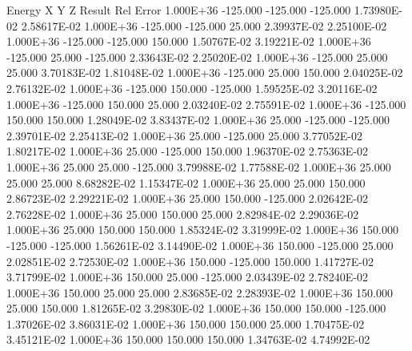    Energy         X         Y         Z     Result     Rel Error
  1.000E+36  -125.000  -125.000  -125.000 1.73980E-02 2.58617E-02
  1.000E+36  -125.000  -125.000    25.000 2.39937E-02 2.25100E-02
  1.000E+36  -125.000  -125.000   150.000 1.50767E-02 3.19221E-02
  1.000E+36  -125.000    25.000  -125.000 2.33643E-02 2.25020E-02
  1.000E+36  -125.000    25.000    25.000 3.70183E-02 1.81048E-02
  1.000E+36  -125.000    25.000   150.000 2.04025E-02 2.76132E-02
  1.000E+36  -125.000   150.000  -125.000 1.59525E-02 3.20116E-02
  1.000E+36  -125.000   150.000    25.000 2.03240E-02 2.75591E-02
  1.000E+36  -125.000   150.000   150.000 1.28049E-02 3.83437E-02
  1.000E+36    25.000  -125.000  -125.000 2.39701E-02 2.25413E-02
  1.000E+36    25.000  -125.000    25.000 3.77052E-02 1.80217E-02
  1.000E+36    25.000  -125.000   150.000 1.96370E-02 2.75363E-02
  1.000E+36    25.000    25.000  -125.000 3.79988E-02 1.77588E-02
  1.000E+36    25.000    25.000    25.000 8.68282E-02 1.15347E-02
  1.000E+36    25.000    25.000   150.000 2.86723E-02 2.29221E-02
  1.000E+36    25.000   150.000  -125.000 2.02642E-02 2.76228E-02
  1.000E+36    25.000   150.000    25.000 2.82984E-02 2.29036E-02
  1.000E+36    25.000   150.000   150.000 1.85324E-02 3.31999E-02
  1.000E+36   150.000  -125.000  -125.000 1.56261E-02 3.14490E-02
  1.000E+36   150.000  -125.000    25.000 2.02851E-02 2.72530E-02
  1.000E+36   150.000  -125.000   150.000 1.41727E-02 3.71799E-02
  1.000E+36   150.000    25.000  -125.000 2.03439E-02 2.78240E-02
  1.000E+36   150.000    25.000    25.000 2.83685E-02 2.28393E-02
  1.000E+36   150.000    25.000   150.000 1.81265E-02 3.29830E-02
  1.000E+36   150.000   150.000  -125.000 1.37026E-02 3.86031E-02
  1.000E+36   150.000   150.000    25.000 1.70475E-02 3.45121E-02
  1.000E+36   150.000   150.000   150.000 1.34763E-02 4.74992E-02
